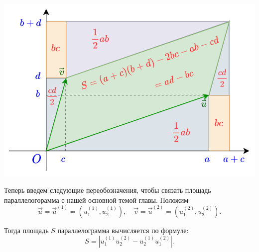 \begin{enumerate}
\begin{center}
\includegraphics[scale=0.4]{paralel.png}
\end{center}

Теперь введем следующие переобозначения, чтобы связать площадь параллелогорамма с нашей основной темой главы. Положим
$$
\vec u = \vec u^{(1)} = (u^{(1)}_1,u^{(1)}_2), \quad \vec v = \vec u^{(2)} = (u^{(2)}_1,u^{(2)}_2).
$$

Тогда площадь $S$ параллелограмма вычисляется по формуле:
$$
S=\left|u^{(1)}_1u^{(2)}_2-u^{(1)}_2u^{(2)}_1\right|.
$$


\end{enumerate}
